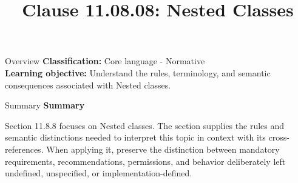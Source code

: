 \documentclass[10pt,letterpaper]{article}
\title{Clause 11.08.08: Nested Classes}
\author{}
\date{}
\begin{document}
\maketitle
\begin{CornellOverviewBox}{Overview}
\textbf{Classification:} Core language - Normative\\[2pt]
\textbf{Learning objective:} Understand the rules, terminology, and semantic consequences associated with Nested classes.
\end{CornellOverviewBox}\begin{CornellSummaryBox}{Summary}
{\sffamily\bfseries\color{Accent} Summary}\par\vspace{3pt}Section 11.8.8 focuses on Nested classes. The section supplies the rules and semantic distinctions needed to interpret this topic in context with its cross-references. When applying it, preserve the distinction between mandatory requirements, recommendations, permissions, and behavior deliberately left undefined, unspecified, or implementation-defined.
\end{CornellSummaryBox}
\end{document}
